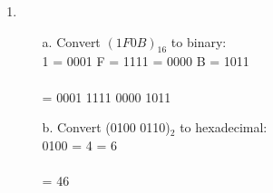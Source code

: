 \begin{enumerate}
    \item
        \begin{itemize}
            \item[a.]   Convert $(1F0B)_{16}$ to binary:
                    ~\\
                    1 = 0001 \tab F = 1111  = 0000 \tab B = 1011 \\ \\
                    = 0001 1111 0000 1011

            \item[b.]   Convert (0100 0110)$_{2}$ to hexadecimal:
                    ~\\
                    0100 = 4  = 6 \\ \\
                    = 46
        \end{itemize}
\end{enumerate}




